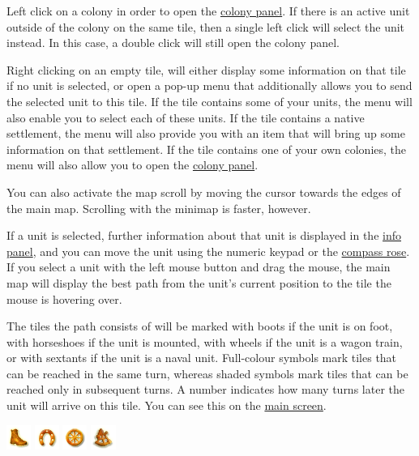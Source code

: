 \documentclass[12pt]{book}
\begin{document}
\vskip5mm

Left click on a colony in order to open the \hyperlink{colony
  panel}{colony panel}. If there is an active unit outside of the
colony on the same tile, then a single left click will select the unit
instead. In this case, a double click will still open the colony
panel.

Right clicking on an empty tile, will either display some information
on that tile if no unit is selected, or open a pop-up menu that
additionally allows you to send the selected unit to this tile. If the
tile contains some of your units, the menu will also enable you to
select each of these units. If the tile contains a native settlement,
the menu will also provide you with an item that will bring up some
information on that settlement. If the tile contains one of your own
colonies, the menu will also allow you to open the \hyperlink{colony
panel}{colony panel}.

You can also activate the map scroll by moving the cursor towards the
edges of the main map. Scrolling with the minimap is faster, however.

If a unit is selected, further information about that unit is
displayed in the \hyperlink{info panel}{info panel}, and you can move
the unit using the numeric keypad or the
\hyperlink{compass rose}{compass rose}. If you select a unit with the
left mouse button and drag the mouse, the main map will display the
best path from the unit's current position to the tile the mouse is
hovering over.

The tiles the path consists of will be marked with boots if the unit
is on foot, with horseshoes if the unit is mounted, with wheels if the
unit is a wagon train, or with sextants if the unit is a naval
unit. Full-colour symbols mark tiles that can be reached in the same
turn, whereas shaded symbols mark tiles that can be reached only in
subsequent turns. A number indicates how many turns later the unit
will arrive on this tile. You can see this on the \hyperlink{main
  screen}{main screen}.


  \begin{center}
    \includegraphics{images/path-foot.png}
    \includegraphics{images/path-horse.png}
    \includegraphics{images/path-wagon.png}
    \includegraphics{images/path-naval.png}
  \end{center}
\end{document}
